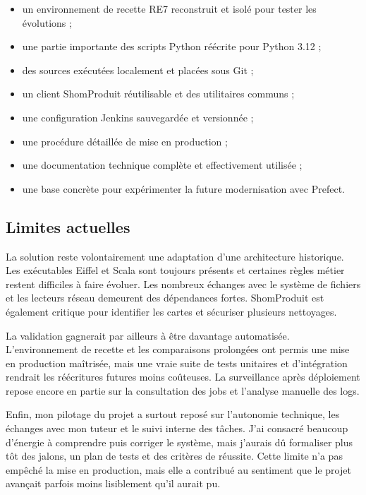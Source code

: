 \begin{itemize}
    \item un environnement de recette RE7 reconstruit et isolé pour tester les évolutions ;
    \item une partie importante des scripts Python réécrite pour Python 3.12 ;
    \item des sources exécutées localement et placées sous Git ;
    \item un client ShomProduit réutilisable et des utilitaires communs ;
    \item une configuration Jenkins sauvegardée et versionnée ;
    \item une procédure détaillée de mise en production ;
    \item une documentation technique complète et effectivement utilisée ;
    \item une base concrète pour expérimenter la future modernisation avec Prefect.
\end{itemize}

\subsection{Limites actuelles}

La solution reste volontairement une adaptation d'une architecture historique. Les exécutables Eiffel et Scala sont toujours présents et certaines règles métier restent difficiles à faire évoluer. Les nombreux échanges avec le système de fichiers et les lecteurs réseau demeurent des dépendances fortes. ShomProduit est également critique pour identifier les cartes et sécuriser plusieurs nettoyages.

La validation gagnerait par ailleurs à être davantage automatisée. L'environnement de recette et les comparaisons prolongées ont permis une mise en production maîtrisée, mais une vraie suite de tests unitaires et d'intégration rendrait les réécritures futures moins coûteuses. La surveillance après déploiement repose encore en partie sur la consultation des jobs et l'analyse manuelle des logs.

Enfin, mon pilotage du projet a surtout reposé sur l'autonomie technique, les échanges avec mon tuteur et le suivi interne des tâches. J'ai consacré beaucoup d'énergie à comprendre puis corriger le système, mais j'aurais dû formaliser plus tôt des jalons, un plan de tests et des critères de réussite. Cette limite n'a pas empêché la mise en production, mais elle a contribué au sentiment que le projet avançait parfois moins lisiblement qu'il aurait pu.

